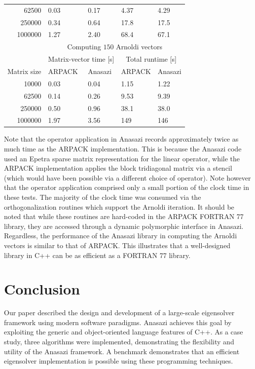 \documentclass[acmtoms,acmnow]{acmtrans2m}
\begin{document}
\begin{table}
\begin{center}
\begin{tabular}{r|ll|ll|}
       62500 & 0.03 & 0.17 & 4.37 & 4.29 \\
       250000 & 0.34 & 0.64 & 17.8 & 17.5 \\
       1000000 & 1.27 & 2.40 & 68.4 & 67.1 \\
       \hline
        & \multicolumn{4}{c|}{Computing $150$ Arnoldi vectors} \\ \cline{2-5}
        & \multicolumn{2}{c|}{Matrix-vector time [s]} &
       \multicolumn{2}{c|}{Total runtime [s]}\\ \hline
       Matrix size & ARPACK & Anasazi & ARPACK & Anasazi \\ \hline %
       10000 & 0.03 & 0.04 & 1.15 & 1.22 \\
       62500 & 0.14 & 0.26 & 9.53 & 9.39 \\
       250000 & 0.50 & 0.96 & 38.1 & 38.0 \\
       1000000 & 1.97 & 3.56 & 149 & 146 \\
       \hline
     \end{tabular}
\end{center}
\end{table}

Note that the operator application in Anasazi records approximately twice as much time as the ARPACK
implementation. This is because the Anasazi code used an Epetra sparse matrix
representation for the linear operator, while the ARPACK implementation applies the block
tridiagonal matrix via a stencil (which would have been possible via a different choice of
operator). Note however that the operator application comprised only a small portion of the clock
time in these tests. The majority of the clock time was consumed via the orthogonalization
routines which support the Arnoldi iteration. It should be noted that while these routines
are hard-coded in the ARPACK FORTRAN 77 library, they are accessed through a dynamic
polymorphic interface in Anasazi. Regardless, the performance of the Anasazi library in
computing the Arnoldi vectors is similar to that of ARPACK. This illustrates that a
well-designed library in C++ can be as efficient as a FORTRAN 77 library.

\section{Conclusion}

Our paper described the design and development of a large-scale eigensolver framework
using modern software paradigms. Anasazi achieves this goal by exploiting the generic and
object-oriented language features of C++. As a case study, three algorithms were
implemented, demonstrating the flexibility and utility of the Anasazi framework. A
benchmark demonstrates that an efficient eigensolver implementation is possible using
these programming techniques. 
\end{document}
